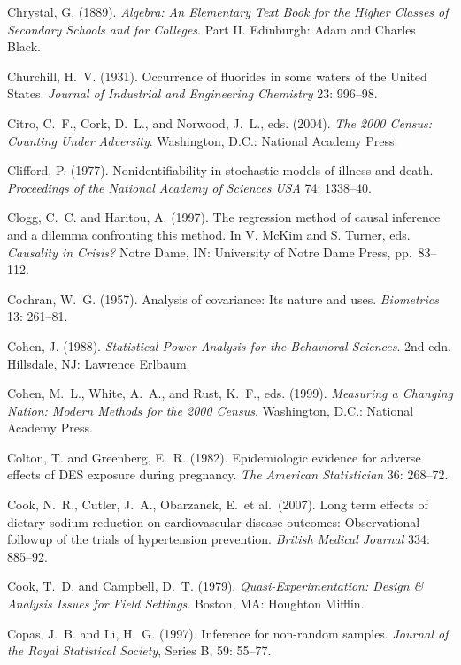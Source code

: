 \smallskip\noindent
Chrystal, G. (1889).
{\it Algebra: An Elementary Text Book for the Higher Classes of Secondary Schools and for Colleges\/}. Part II.
Edinburgh: Adam and Charles Black.

\smallskip\noindent
Churchill, H.~V. (1931).
Occurrence of fluorides in some waters of the United States.
{\it Journal of Industrial and Engineering Chemistry\/} 23: 996--98.

\smallskip\noindent
Citro, C.~F., Cork, D.~L., and Norwood, J.~L., eds. (2004).
{\it The 2000 Census: Counting Under Adversity\/}.
Washington, D.C.: National Academy Press.

\smallskip \noindent
Clifford, P. (1977).
Nonidentifiability in stochastic models of illness and death.
{\it Proceedings of the National Academy of Sciences\/} {\it USA\/} 74: 1338--40.

\smallskip\noindent
Clogg, C.~C. and Haritou, A. (1997).
The regression method of causal inference and a dilemma confronting this method.
In V. McKim and S. Turner, eds. {\it Causality in Crisis?\/}
Notre Dame, IN: University of Notre Dame Press, pp.~83--112.

\smallskip\noindent
Cochran, W.~G. (1957).
Analysis of covariance: Its nature and uses.
{\it Biometrics} 13: 261--81.

\smallskip\noindent
Cohen, J. (1988).
{\it Statistical Power Analysis for the Behavioral Sciences\/}. 2nd edn.
Hillsdale, NJ: Lawrence Erlbaum.

\smallskip\noindent
Cohen, M.~L., White, A.~A., and Rust, K.~F., eds. (1999).
{\it  Measuring a Changing Nation:  Modern Methods for the 2000 Census\/}.
Washington, D.C.: National Academy Press.

\smallskip\noindent
Colton, T. and Greenberg, E.~R. (1982).
Epidemiologic evidence for adverse effects of DES exposure during pregnancy.
{\it The American Statistician\/} 36: 268--72.

\smallskip\noindent
Cook, N.~R., Cutler, J.~A., Obarzanek, E.~et al.~(2007).
Long term effects of dietary sodium reduction on cardiovascular disease outcomes:
Observational followup of the trials of hypertension prevention.
{\it British Medical Journal\/} 334: 885--92.

\smallskip\noindent
Cook, T.~D. and Campbell, D.~T. (1979).
{\it Quasi-Experimentation: Design \& Analysis Issues for Field Settings\/}.
Boston, MA: Houghton Mifflin.

\smallskip\noindent
Copas, J.~B. and Li, H.~G. (1997).
Inference for non-random samples.
{\it Journal of the Royal Statistical Society\/}, Series B, 59: 55--77.

